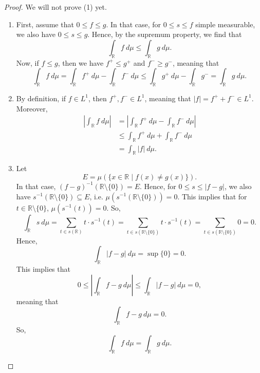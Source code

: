 \documentclass[a4paper, openany]{memoir}
\theoremstyle{definition}
\theoremstyle{plain}
\begin{document}
    \begin{proof}
        We will not prove (1) yet.
        \begin{enumerate}
            \addtocounter{enumi}{1}
            \item First, assume that $0 \leq f \leq g$. In that case, for $0 \leq s \leq f$ simple measurable, we also have $0 \leq s \leq g$. Hence, by the supremum property, we find that
            \[\int_{\mathbb{R}} f \ d\mu \leq \int_{\mathbb{R}} g \ d\mu.\]
            Now, if $f \leq g$, then we have $f^+ \leq g^+$ and $f^- \geq g^-$, meaning that
            \[\int_{\mathbb{R}} f \ d\mu = \int_{\mathbb{R}} f^+ \ d\mu - \int_{\mathbb{R}} f^- \ d\mu \leq \int_{\mathbb{R}} g^+ \ d\mu - \int_{\mathbb{R}} g^- = \int_{\mathbb{R}} g \ d\mu.\]
            
            \item By definition, if $f \in L^1$, then $f^+, f^- \in L^1$, meaning that $|f| = f^+ + f^- \in L^1$. Moreover,
            \begin{align*}
                \left|\int_{\mathbb{R}} f \ d\mu\right| &= \left|\int_{\mathbb{R}} f^+ \ d\mu - \int_{\mathbb{R}} f^- \ d\mu \right| \\
                &\leq \int_{\mathbb{R}} f^+ \ d\mu + \int_{\mathbb{R}} f^- \ d\mu \\
                &= \int_{\mathbb{R}} |f| \ d\mu.
            \end{align*}
            
            \item Let
            \[E = \mu(\{x \in \mathbb{R} \mid f(x) \neq g(x)\}).\]
            In that case, $(f - g)^{-1}(\mathbb{R} \setminus \{0\}) = E$. Hence, for $0 \leq s \leq |f - g|$, we also have $s^{-1}(\mathbb{R} \setminus \{0\}) \subseteq E$, i.e. $\mu(s^{-1}(\mathbb{R} \setminus \{0\})) = 0$. This implies that for $t \in \mathbb{R} \setminus \{0\}$, $\mu(s^{-1}(t)) = 0$. So,
            \[\int_{\mathbb{R}} s \ d\mu = \sum_{t \in s(\mathbb{R})} t \cdot s^{-1}(t) = \sum_{t \in s(\mathbb{R} \setminus \{0\})} t \cdot s^{-1}(t) = \sum_{t \in s(\mathbb{R} \setminus \{0\})} 0 = 0.\]
            Hence,
            \[\int_{\mathbb{R}} |f - g| \ d\mu = \sup \{0\} = 0.\]
            This implies that
            \[0 \leq \left|\int_{\mathbb{R}} f - g \ d\mu \right| \leq \int_{\mathbb{R}} |f - g| \ d\mu = 0,\]
            meaning that
            \[\int_{\mathbb{R}} f - g \ d\mu = 0.\]
            So,
            \[\int_{\mathbb{R}} f \ d\mu = \int_{\mathbb{R}} g \ d\mu.\]
        \end{enumerate}
    \end{proof}
    \newpage
\end{document}
